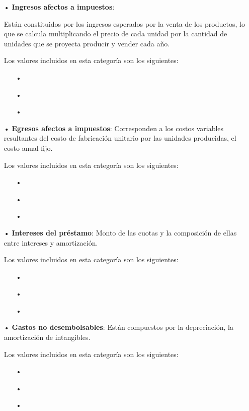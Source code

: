 \begin{enumerate}
\item[•]\textbf{Ingresos afectos a impuestos}:

Están constituidos por los ingresos esperados por la 
venta de los productos, lo que se calcula multiplicando el precio de cada unidad por 
la cantidad de unidades que se proyecta producir y vender cada año.

Los valores incluidos en esta categoría son los siguientes:
\begin{enumerate}
\item[•]
\item[•]
\item[•]
\end{enumerate}

\item[•]\textbf{Egresos afectos a impuestos}:
Corresponden a los costos variables resultantes del 
costo de fabricación unitario por las unidades producidas, el costo anual fijo.

Los valores incluidos en esta categoría son los siguientes:
\begin{enumerate}
\item[•]
\item[•]
\item[•]
\end{enumerate}



\item[•]\textbf{Intereses del préstamo}:
Monto de las cuotas y la composición de ellas entre intereses y amortización.

Los valores incluidos en esta categoría son los siguientes:
\begin{enumerate}
\item[•]
\item[•]
\item[•]
\end{enumerate}



\item[•]\textbf{Gastos no desembolsables}:
Están compuestos por la depreciación, la amortización de intangibles.

Los valores incluidos en esta categoría son los siguientes:
\begin{enumerate}
\item[•]
\item[•]
\item[•]
\end{enumerate}





\end{enumerate}
